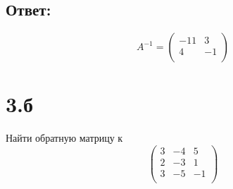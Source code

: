 \documentclass[a4paper]{article}
\begin{document}
\subsection{Ответ:}
\begin{equation*}
A^{-1} = \begin{pmatrix}
-11 & 3\\
4 & -1\\
\end{pmatrix}
\end{equation*}



\section*{3.б}
Найти обратную матрицу к 
\begin{equation*}
\begin{pmatrix}
3 & -4 & 5\\
2 & -3 & 1\\
3 & -5 & -1\\
\end{pmatrix}
\end{equation*}
\end{document}
